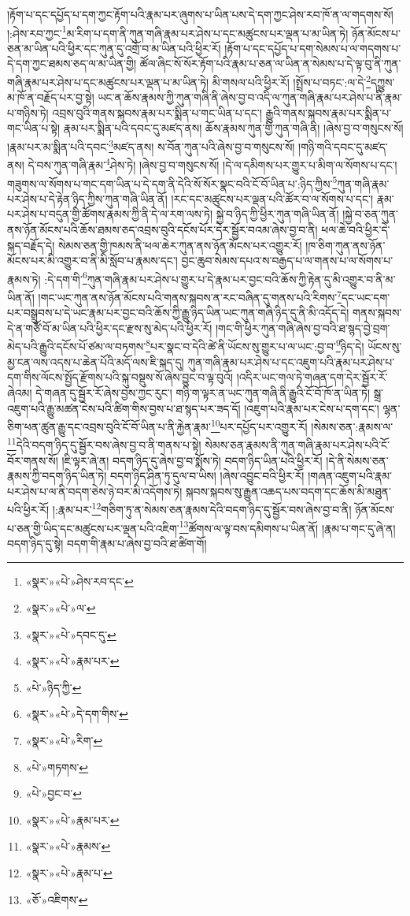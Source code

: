 །རྟོག་པ་དང་དཔྱོད་པ་དག་ཀྱང་རྟོག་པའི་རྣམ་པར་ཞུགས་པ་ཡིན་པས་དེ་དག་ཀྱང་ཤེས་རབ་ཁོ་ན་ལ་གདགས་སོ། །:ཤེས་རབ་ཀྱང་\footnote{«སྣར་»«པེ་»ཤེས་རབ་དང་}མ་རིག་པ་དག་ནི་ཀུན་གཞི་རྣམ་པར་ཤེས་པ་དང་མཚུངས་པར་ལྡན་པ་མ་ཡིན་ཏེ། ཉོན་མོངས་པ་ཅན་མ་ཡིན་པའི་ཕྱིར་དང་ཀུན་དུ་འགྲོ་བ་མ་ཡིན་པའི་ཕྱིར་རོ། །རྟོག་པ་དང་དཔྱོད་པ་དག་སེམས་པ་ལ་གདགས་པ་དེ་དག་ཀྱང་ཐམས་ཅད་ལ་མ་ཡིན་གྱི། ཚོལ་ཞིང་སོ་སོར་རྟོག་པའི་རྣམ་པ་ཅན་ལ་ཡིན་ན་སེམས་པ་དེ་ལྟ་བུ་ནི་ཀུན་གཞི་རྣམ་པར་ཤེས་པ་དང་མཚུངས་པར་ལྡན་པ་མ་ཡིན་ཏེ། མི་གསལ་པའི་ཕྱིར་རོ། །སྤྲོས་པ་བཏང་:ལ་དེ་\footnote{«སྣར་»«པེ་»ལ་}དཀྱུས་མ་ཁོ་ན་བརྗོད་པར་བྱ་སྟེ། ཡང་ན་ཆོས་རྣམས་ཀྱི་ཀུན་གཞི་ནི་ཞེས་བྱ་བ་འདི་ལ་ཀུན་གཞི་རྣམ་པར་ཤེས་པ་ནི་རྣམ་པ་གཉིས་ཏེ། འབྲས་བུའི་གནས་སྐབས་རྣམ་པར་སྨིན་པ་གང་ཡིན་པ་དང་། རྒྱུའི་གནས་སྐབས་རྣམ་པར་སྨིན་པ་གང་ཡིན་པ་སྟེ། རྣམ་པར་སྨིན་པའི་དབང་དུ་མཛད་ནས། ཆོས་རྣམས་ཀུན་གྱི་ཀུན་གཞི་ནི། །ཞེས་བྱ་བ་གསུངས་སོ། །རྣམ་པར་མ་སྨིན་པའི་དབང་\footnote{«སྣར་»«པེ་»དབང་དུ་}མཛད་ནས། ས་བོན་ཀུན་པའི་ཞེས་བྱ་བ་གསུངས་སོ། །གཉི་གའི་དབང་དུ་མཛད་ནས། དེ་བས་ཀུན་གཞི་རྣམ་\footnote{«སྣར་»«པེ་»རྣམ་པར་}ཤེས་ཏེ། །ཞེས་བྱ་བ་གསུངས་སོ། །དེ་ལ་དམིགས་པར་གྱུར་པ་མིག་ལ་སོགས་པ་དང་། གཟུགས་ལ་སོགས་པ་གང་དག་ཡིན་པ་དེ་དག་ནི་དེའི་སོ་སོར་སྣང་བའི་ངོ་བོ་ཡིན་པ་:ཉིད་ཀྱིས་\footnote{«པེ་»ཉིད་ཀྱི་}ཀུན་གཞི་རྣམ་པར་ཤེས་པ་དེ་རྟེན་ཉིད་ཀྱིས་ཀུན་གཞི་ཡིན་ནོ། །རང་དང་མཚུངས་པར་ལྡན་པའི་ཚོར་བ་ལ་སོགས་པ་དང་། རྣམ་པར་ཤེས་པ་བདུན་གྱི་ཚོགས་རྣམས་ཀྱི་ནི་དེ་ལ་རག་ལས་ཏེ། སྐྱེ་བ་ཉིད་ཀྱི་ཕྱིར་ཀུན་གཞི་ཡིན་ནོ། །སྐྱེ་བ་ཅན་ཀུན་ནས་ཉོན་མོངས་པའི་ཆོས་ཐམས་ཅད་འབྲས་བུའི་དངོས་པོར་དེར་སྦྱོར་བའམ་ཞེས་བྱ་བ་ནི། ཕལ་ཆེ་བའི་ཕྱིར་དེ་སྐད་བརྗོད་དེ། སེམས་ཅན་གྱི་ཁམས་ནི་ཕལ་ཆེར་ཀུན་ནས་ཉོན་མོངས་པར་འགྱུར་རོ། །ཁ་ཅིག་ཀུན་ནས་ཉོན་མོངས་པར་མི་འགྱུར་བ་ནི་མི་སློབ་པ་རྣམས་དང་། བྱང་ཆུབ་སེམས་དཔའ་ས་བརྒྱད་པ་ལ་གནས་པ་ལ་སོགས་པ་རྣམས་ཏེ། :དེ་དག་གི་\footnote{«སྣར་»«པེ་»དེ་དག་གིས་}ཀུན་གཞི་རྣམ་པར་ཤེས་པ་གྱུར་པ་དེ་རྣམ་པར་བྱང་བའི་ཆོས་ཀྱི་རྟེན་དུ་མི་འགྱུར་བ་ནི་མ་ཡིན་ནོ། །གང་ཡང་ཀུན་ནས་ཉོན་མོངས་པའི་གནས་སྐབས་ན་རང་བཞིན་དུ་གནས་པའི་རིགས་\footnote{«སྣར་»«པེ་»རིག་}དང་ཡང་དག་པར་བསྒྲུབས་པ་དེ་ཡང་རྣམ་པར་བྱང་བའི་ཆོས་ཀྱི་རྒྱུ་ཉིད་ཡིན་ཡང་ཀུན་གཞི་ཉིད་དུ་ནི་མི་འདོད་དེ། གནས་སྐབས་དེ་ན་གཙོ་བོ་མ་ཡིན་པའི་ཕྱིར་དང་རྫས་སུ་མེད་པའི་ཕྱིར་རོ། །གང་གི་ཕྱིར་ཀུན་གཞི་ཞེས་བྱ་བའི་ཐ་སྙད་བྱེ་བྲག་མེད་པའི་རྒྱུའི་དངོས་པོ་ཙམ་ལ་བཏགས་\footnote{«པེ་»གཏགས་}པར་སྣང་བ་དེའི་ཚེ་ནི་ཡོངས་སུ་གྱུར་པ་ལ་ཡང་:བྱ་བ་\footnote{«པེ་»བྱང་བ་}ཉིད་དེ། ཡོངས་སུ་མྱ་ངན་ལས་འདས་པ་ཆེན་པོའི་མདོ་ལས་ཇི་སྐད་དུ། ཀུན་གཞི་རྣམ་པར་ཤེས་པ་དང་འཇུག་པའི་རྣམ་པར་ཤེས་པ་དག་གིས་ལོངས་སྤྱོད་རྫོགས་པའི་སྐུ་བསྡུས་སོ་ཞེས་བྱུང་བ་ལྟ་བུའོ། །འདིར་ཡང་གལ་ཏེ་གཞན་དག་དེར་སྦྱོར་རོ་ཞེའམ། དེ་གཞན་དུ་སྦྱོར་རོ་ཞེས་བྱས་ཀྱང་རུང་། གཉི་ག་ལྟར་ན་ཡང་ཀུན་གཞི་ནི་རྒྱུའི་ངོ་བོ་ཁོ་ན་ཡིན་ཏེ། སྒྲ་འཇུག་པའི་རྒྱུ་མཚན་ངེས་པའི་ཚིག་གིས་བྱས་པ་ཐ་སྙད་པར་ཟད་དོ། །འཇུག་པའི་རྣམ་པར་ངེས་པ་དག་དང་། ལྷན་ཅིག་ཕན་ཚུན་རྒྱུ་དང་འབྲས་བུའི་ངོ་བོ་ཡིན་པ་ནི་རྐྱེན་རྣམ་\footnote{«སྣར་»«པེ་»རྣམ་པར་}པར་དཔྱོད་པར་འགྱུར་རོ། །སེམས་ཅན་:རྣམས་ལ་\footnote{«སྣར་»«པེ་»རྣམས་}དེའི་བདག་ཉིད་དུ་སྦྱོར་བས་ཞེས་བྱ་བ་ནི་གནས་པ་སྟེ། སེམས་ཅན་རྣམས་ནི་ཀུན་གཞི་རྣམ་པར་ཤེས་པའི་ངོ་བོར་གནས་སོ། །ཇི་ལྟར་ཞེ་ན། བདག་ཉིད་དུ་ཞེས་བྱ་བ་སྨོས་ཏེ། བདག་ཉིད་ཡིན་པའི་ཕྱིར་རོ། །དེ་ནི་སེམས་ཅན་རྣམས་ཀྱི་བདག་ཉིད་ཡིན་ཏེ། བདག་ཉིད་ཤིན་ཏུ་དུལ་བ་ཡིས། །ཞེས་འབྱུང་བའི་ཕྱིར་རོ། །གཞན་འཇུག་པའི་རྣམ་པར་ཤེས་པ་ལ་ནི་བདག་ཅེས་ཉེ་བར་མི་འདོགས་ཏེ། སྐབས་སྐབས་སུ་རྒྱུན་འཆད་པས་བདག་དང་ཆོས་མི་མཐུན་པའི་ཕྱིར་རོ། །:རྣམ་པར་\footnote{«སྣར་»«པེ་»རྣམ་པ་}གཅིག་ཏུ་ན་སེམས་ཅན་རྣམས་དེའི་བདག་ཉིད་དུ་སྦྱོར་བས་ཞེས་བྱ་བ་ནི། ཉོན་མོངས་པ་ཅན་གྱི་ཡིད་དང་མཚུངས་པར་ལྡན་པའི་འཇིག་\footnote{«ཅོ་»འཇིགས་}ཚོགས་ལ་ལྟ་བས་དམིགས་པ་ཡིན་ནོ། །རྣམ་པ་གང་དུ་ཞེ་ན། བདག་ཉིད་དུ་སྟེ། བདག་གི་རྣམ་པ་ཞེས་བྱ་བའི་ཐ་ཚིག་གོ། 